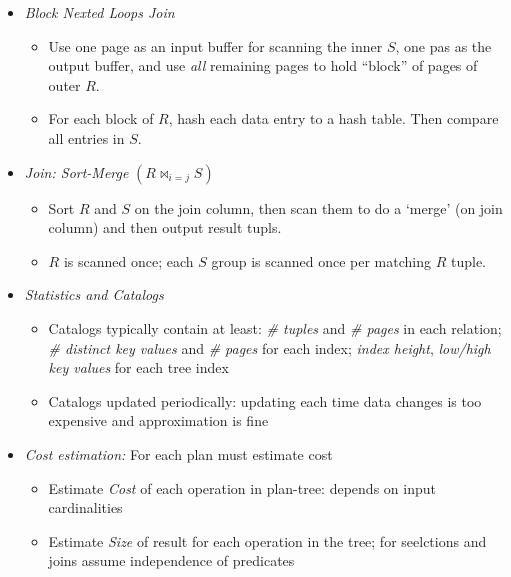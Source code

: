 \documentclass[landscape,8pt]{extarticle}
\begin{document}
\begin{multicols}{4}
\begin{itemize}
\begin{itemize}
\begin{itemize}
                \item For each $R$ tuple, cost of probing $S$ index is about 1.2 for hash index, 2-4 for B+ tree. Cost of then finding $S$ tuples (assuming alt. 2 or 3) depends on clustering. Clustered typically 1 I/O, unclustered up to 1 I/O per matching $S$ tuple.
            \end{itemize}
            \item \emph{Block Nexted Loops Join}
            \begin{itemize}
                \item Use one page as an input buffer for scanning the inner $S$, one pas as the output buffer, and use \emph{all} remaining pages to hold ``block'' of pages of outer $R$.
                \item For each block of $R$, hash each data entry to a hash table. Then compare all entries in $S$.
            \end{itemize}
            \item \emph{Join: Sort-Merge } $\left (R \bowtie_{i=j} S \right)$
            \begin{itemize}
                \item Sort $R$ and $S$ on the join column, then scan them to do a `merge' (on join column) and then output result tupls.
                \item $R$ is scanned once; each $S$ group is scanned once per matching $R$ tuple.
            \end{itemize}
            \item \emph{Statistics and Catalogs}
            \begin{itemize}
                \item Catalogs typically contain at least: \emph{\# tuples} and \emph{\# pages} in each relation; \emph{\# distinct key values} and \emph{\# pages} for each index; \emph{index height}, \emph{low/high key values} for each tree index
                \item Catalogs updated periodically: updating each time data changes is too expensive and approximation is fine
            \end{itemize}
            \item \emph{Cost estimation:} For each plan must estimate cost
            \begin{itemize}
                \item Estimate \emph{Cost} of each operation in plan-tree: depends on input cardinalities
                \item Estimate \emph{Size} of result for each operation in the tree; for seelctions and joins assume independence of predicates

\end{itemize}
\end{itemize}
\end{itemize}
\end{multicols}
\end{document}
